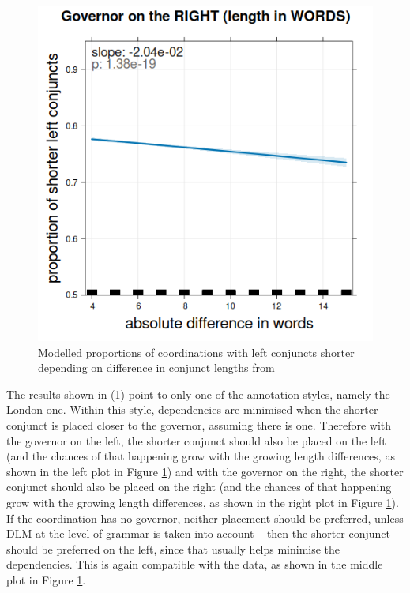 \begin{figure}[H]
    \includegraphics[scale=0.27]{inputs/coca-R.png}
    \caption{Modelled proportions of coordinations with left conjuncts shorter depending on difference in conjunct lengths from \cite{prz:etal:24}}\label{fig:pbg24-results}
\end{figure}

The results shown in (\ref{fig:pbg24-results}) point to only one of the annotation styles, namely the London one. Within this style, dependencies are minimised when the shorter conjunct is placed closer to the governor, assuming there is one. Therefore with the governor on the left, the shorter conjunct should also be placed on the left (and the chances of that happening grow with the growing length differences, as shown in the left plot in Figure \ref{fig:pbg24-results}) and with the governor on the right, the shorter conjunct should also be placed on the right (and the chances of that happening grow with the growing length differences, as shown in the right plot in Figure \ref{fig:pbg24-results}). If the coordination has no governor, neither placement should be preferred, unless DLM at the level of grammar is taken into account -- then the shorter conjunct should be preferred on the left, since that usually helps minimise the dependencies. This is again compatible with the data, as shown in the middle plot in Figure \ref{fig:pbg24-results}.


